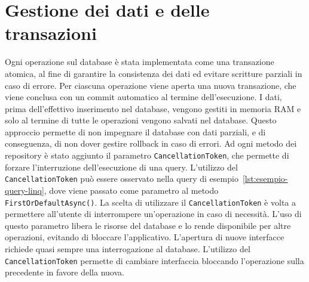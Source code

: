 \section{Gestione dei dati e delle transazioni}
Ogni operazione sul database è stata implementata come una transazione atomica,
al fine di garantire la consistenza dei dati ed evitare scritture parziali 
in caso di errore. Per ciascuna operazione viene aperta una nuova transazione, 
che viene conclusa con un commit automatico al termine dell'esecuzione.
I dati, prima dell'effettivo inserimento nel database,
vengono gestiti in memoria \ac{RAM} e solo al termine di tutte le operazioni vengono salvati nel database.
Questo approccio permette di non impegnare il database con dati parziali,
e di conseguenza, di non dover gestire rollback in caso di errori.
Ad ogni metodo dei repository è stato aggiunto il parametro \texttt{CancellationToken}\cite{CancToken},
che permette di forzare l'interruzione dell'esecuzione di una query.
L'utilizzo del \texttt{CancellationToken} può essere osservato nella query di esempio~\ref{lst:esempio-query-linq},
dove viene passato come parametro al metodo \texttt{FirstOrDefaultAsync()}.
La scelta di utilizzare il \texttt{CancellationToken} è volta a permettere all'utente di interrompere
un'operazione in caso di necessità.
L'uso di questo parametro libera le risorse del database e lo rende disponibile per altre operazioni,
evitando di bloccare l'applicativo.
L'apertura di nuove interfacce richiede quasi sempre una interrogazione al database.
L'utilizzo del \texttt{CancellationToken} permette di cambiare
interfaccia bloccando l'operazione sulla precedente in favore della nuova.
